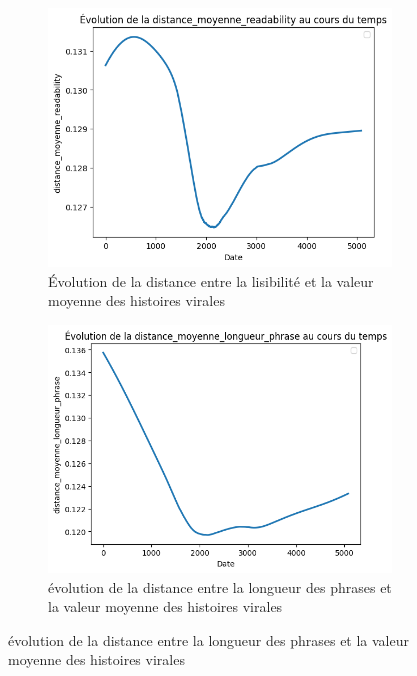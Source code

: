 \documentclass[12pt,a4paper,oneside,titlepage]{book} %
\begin{document}
 \begin{figure}[htbp]
	\centering
	\begin{subfigure}[b]{0.45\textwidth}
		\includegraphics[width=\textwidth]{illustration/distance_lisibilite.png}
		\caption{Évolution de la distance entre la lisibilité et la valeur moyenne des histoires virales}
		\label{fig:distance_lisibilité}
	\end{subfigure}
	\hfill
	\begin{subfigure}[b]{0.45\textwidth}
		\includegraphics[width=\textwidth]{illustration/distance_phrases.png}
		\caption{évolution de la distance entre la longueur des phrases et la valeur moyenne des histoires virales}
		\label{fig:distance_phrases}
	\end{subfigure}
\end{figure}
\end{document}
